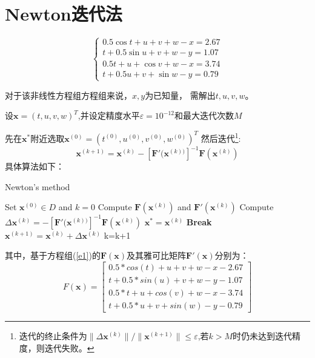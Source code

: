 \newpage
\section{Newton迭代法}
\label{sec:Newton}
\begin{equation}
\label{e1}
\left\{ \begin{array}{l}
0.5\cos t + u + v + w - x = 2.67\\
t + 0.5\sin u + v + w - y = 1.07\\
0.5t + u + \cos v + w - x = 3.74\\
t + 0.5u + v + \sin w - y = 0.79
\end{array} \right.
\end{equation}


对于该非线性方程组方程组来说，$x,y$为已知量，
需解出$t,u,v,w$。

设$\bm{x}= {(t,u,v,w)^T}$,并设定精度水平${\varepsilon } = {10^{ - 12}}$和最大迭代次数$M$

先在${\bm{x}^{\ast}}$附近选取${\bm{x}^{(0)}}= {({t^{(0)}},{u^{(0)}},{v^{(0)}},{w^{(0)}})^T}$
然后迭代\footnote{迭代的终止条件为$\|\Delta \bm{x}^{(k)}\|/\|\bm{x}^{(k+1)}\|\le \varepsilon$,若$k>M$时仍未达到迭代精度，则迭代失败。}:
\[\bm{x}^{(k+1)}= \bm{x}^{(k)}-[\bm{F}'(\bm{x}^{(k))}]^{-1}\bm{F}(\bm{x}^{(k)})\]
具体算法如下：
\begin{algorithm}[h]  
\caption{Newton's method}  
\begin{algorithmic}[1]  
\STATE Set $\bm{x}^{(0)}\in D$ and $k=0$
\STATE Compute $\bm{F}(\bm{x}^{(k)})$ 
and $\bm{F}'(\bm{x}^{(k)})$
\STATE Compute $\Delta \bm{x}^{(k)}=-[\bm{F}'(\bm{x}^{(k))}]^{-1}\bm{F}(\bm{x}^{(k)})$
\STATE $\bm{x}^{\ast}=\bm{x}^{(k)}$
\STATE \textbf{Break}
\ENDIF 
\STATE $\bm{x}^{(k+1)}= \bm{x}^{(k)}+
\Delta \bm{x}^{(k)}$
\STATE k=k+1
\ENDWHILE
\end{algorithmic}  
\end{algorithm}  

其中，基于方程组(\ref{e1})的$\bm{F}(\bm{x})\text{及其雅可比矩阵}\bm{F}'(\bm{x})$分别为：
\[F(\bm{x}) = \left[ \begin{array}{l}
0.5*cos(t)  +  u  +  v  +  w  -  x  -  2.67\\
t  +  0.5*sin(u)  +  v  +  w  -  y  -  1.07\\
0.5*t  +  u  +  cos(v)  +  w  -  x  -  3.74\\
t  +  0.5*u  +  v  +  sin(w)  -  y  -  0.79
\end{array} \right]\]

